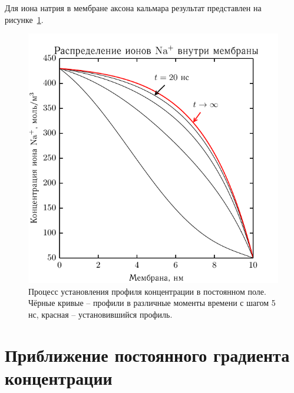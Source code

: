 \documentclass{hedwork}
\begin{document}
    Для иона натрия в мембране аксона кальмара результат представлен на
    рисунке~\ref{fig:1}.
    \begin{figure}[h]
    \begin{center}
        \includegraphics[width=.7\textwidth]{plots/linear_field}
    \end{center}
    \caption{Процесс установления профиля концентрации в постоянном поле. Чёрные
    кривые -- профили в различные моменты времени с шагом 5 нс, красная --
    установившийся профиль.}
    \label{fig:1}
    \end{figure}


\section{Приближение постоянного градиента концентрации}
\end{document}
